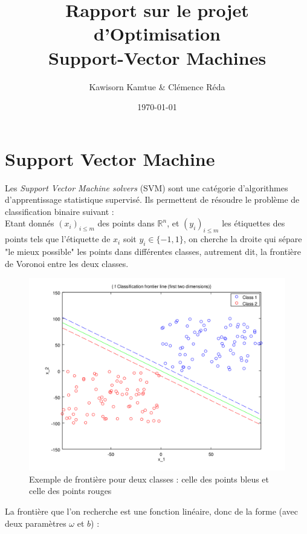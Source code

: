\documentclass{article}
\title{Rapport sur le projet d'Optimisation\\Support-Vector Machines}
\author{Kawisorn Kamtue \& Clémence Réda}
\date{\today}
\begin{document}
\maketitle

\section{Support Vector Machine}

Les \emph{Support Vector Machine solvers} (SVM) sont une catégorie d'algorithmes d'apprentissage statistique supervisé. Ils permettent de résoudre le problème de classification binaire suivant :\\

           
           Etant donnés $(x_i)_{i \leq m}$ des points dans $\mathbb{R}^n$, et $(y_i)_{i \leq m}$ les étiquettes des points tels que l'étiquette de $x_i$ soit $y_i \in \{-1, 1\}$, on cherche la droite qui sépare "le mieux possible" les points dans différentes classes, autrement dit, la frontière de Voronoi entre les deux classes.

           \begin{figure}[H]
           \centering
           \caption{Exemple de frontière pour deux classes : celle des points bleus et celle des points rouges}
           \includegraphics[scale=0.3]{images/voronoi.png}
           \end{figure}


\noindent La frontière que l'on recherche est une fonction linéaire, donc de la forme (avec deux paramètres $\omega$ et $b$) :\\
\end{document}
